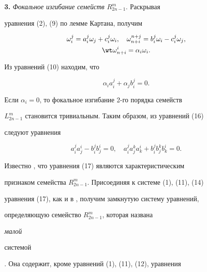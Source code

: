 \medskip 


 


{\bf 3.} {\it Фокальное изгибание семейств $R^m_{2n-1}$}. Раскрывая 


уравнения (2), (9) по лемме Картана, получим 


\begin{gather} 


\omega^j_i=a^j_i\omega_j+c^j_i\omega_i,\quad 


\omega^{n+j}_{n+i}=b^j_i\omega_i-c^j_i\omega_j,\\ 


\wt\omega^i_{n+i}=\alpha_i\omega_i. 


\end{gather} 


Из уравнений (10) находим, что 


\begin{equation} 


\alpha_i a^j_i+\alpha_j b^j_i=0. 


\end{equation} 


Если $\alpha_i=0$, то фокальное изгибание 2-го порядка семейств 


$L^m_{2n-1}$ становится тривиальным. Таким образом, из уравнений (16) 


следуют уравнения 


\begin{equation} 


a^j_i a^i_j-b^j_i b^i_j=0,\quad 


a^j_i a^k_j a^i_k+b^j_i b^k_j b^i_k=0. 


\end{equation} 


 


Известно \cite{3}, что уравнения (17) являются характеристическим 


признаком семейства $R^m_{2n-1}$. Присоединяя к системе (1), (11), (14) 


уравнения (17), как и в \cite{2}, получим замкнутую систему уравнений, 


определяющую семейство $R^m_{2n-1}$, которая названа {\it малой 


системой}. Она содержит, кроме уравнений (1), (11), (12), уравнения 


